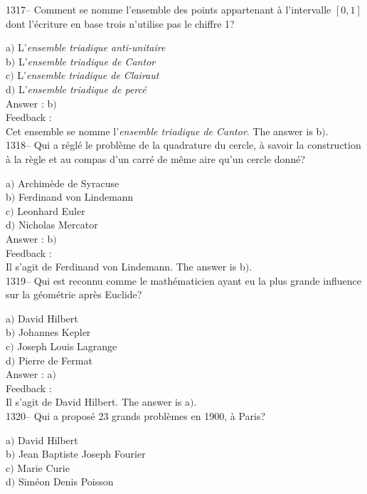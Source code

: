 ﻿\documentclass[letterpaper, 12pt]{article}
\begin{document}
1317-- Comment se nomme l'ensemble des points appartenant \`a
l'intervalle $[0,1]$ dont l'\'ecriture en base trois n'utilise pas
le chiffre 1?

a$)$ L'{\sl ensemble triadique anti-unitaire} \\
b$)$ L'{\sl ensemble triadique de Cantor} \\
c$)$ L'{\sl ensemble triadique de Clairaut} \\
d$)$ L'{\sl ensemble triadique de perc\'e}\\

Answer : b$)$\\

Feedback : \\
Cet ensemble se nomme l'{\sl ensemble triadique de Cantor}.
The answer is  b$)$.\\

1318-- Qui a r\'egl\'e le probl\`eme de la quadrature du cercle, \`a
savoir la construction \`a la r\`egle et au compas d'un carr\'e de
m\^eme aire qu'un cercle donn\'e?

a$)$ Archim\`ede de Syracuse \\
b$)$ Ferdinand von Lindemann \\
c$)$ Leonhard Euler \\
d$)$ Nicholas Mercator\\

Answer : b$)$\\

Feedback : \\
Il s'agit de Ferdinand von Lindemann.
The answer is  b$)$.\\

1319-- Qui est reconnu comme le math\'ematicien ayant eu la plus
grande influence sur la g\'eom\'etrie apr\`es Euclide?

a$)$ David Hilbert \\
b$)$ Johannes Kepler \\
c$)$ Joseph Louis Lagrange \\
d$)$ Pierre de Fermat\\

Answer : a$)$\\

Feedback : \\
Il s'agit de David Hilbert.
The answer is  a$)$.\\

1320-- Qui a propos\'e 23 grands probl\`emes en 1900, \`a Paris?

a$)$ David Hilbert \\
b$)$ Jean Baptiste Joseph Fourier \\
c$)$ Marie Curie \\
d$)$ Sim\'eon Denis Poisson\\
\end{document}
